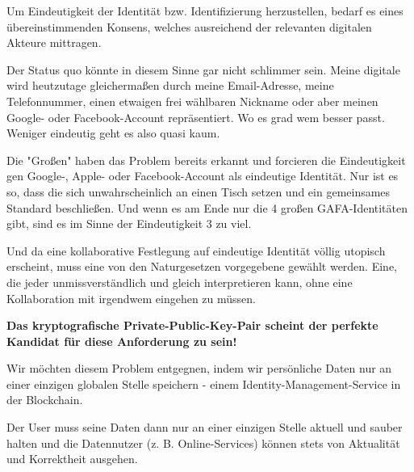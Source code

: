 
\vspace{0.3cm}

\begin{Solution}\label{sol1}

Um Eindeutigkeit der Identität bzw. Identifizierung herzustellen, bedarf es eines übereinstimmenden Konsens, welches ausreichend der relevanten digitalen Akteure mittragen.

Der Status quo könnte in diesem Sinne gar nicht schlimmer sein. Meine digitale wird heutzutage gleichermaßen durch meine Email-Adresse, meine Telefonnummer, einen etwaigen frei wählbaren Nickname oder aber meinen Google- oder Facebook-Account repräsentiert. Wo es grad wem besser passt. Weniger eindeutig geht es also quasi kaum.

Die "Großen" haben das Problem bereits erkannt und forcieren die Eindeutigkeit gen Google-, Apple- oder Facebook-Account als eindeutige Identität. Nur ist es so, dass die sich unwahrscheinlich an einen Tisch setzen und ein gemeinsames Standard beschließen. Und wenn es am Ende nur die 4 großen GAFA-Identitäten gibt, sind es im Sinne der Eindeutigkeit 3 zu viel.

\vspace{0.2cm}

Und da eine kollaborative Festlegung auf eindeutige Identität völlig utopisch erscheint, muss eine von den Naturgesetzen vorgegebene gewählt werden. Eine, die jeder unmissverständlich und gleich interpretieren kann, ohne eine Kollaboration mit irgendwem eingehen zu müssen.

\vspace{0.2cm}

\textbf{Das kryptografische Private-Public-Key-Pair scheint der perfekte Kandidat für diese Anforderung zu sein!}

\end{Solution}

\vspace{0.3cm}


\begin{Solution} \label{sol2}

Wir möchten diesem Problem entgegnen, indem wir persönliche Daten nur an einer einzigen globalen Stelle speichern - einem Identity-Management-Service in der \newline Blockchain.

Der User muss seine Daten dann nur an einer einzigen Stelle aktuell und sauber halten und die Datennutzer (z. B. Online-Services) können stets von Aktualität und Korrektheit ausgehen.

\end{Solution}

